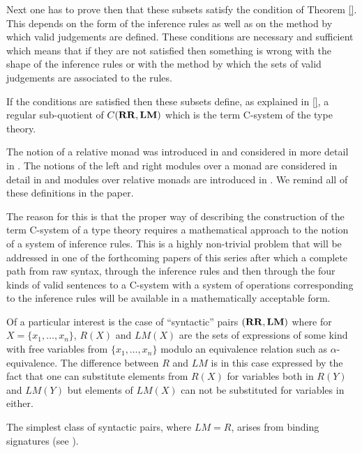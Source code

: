 \documentclass[11pt]{article}
\newcommand{\RR}{{\bf RR}}
\newcommand{\LM}{{\bf LM}}
\begin{document}
Next one has to prove then that these subsets satisfy the condition of Theorem \ref{}. This depends on the form of the inference rules as well as on the method by which valid judgements are defined. These conditions are necessary and sufficient which means that if they are not satisfied then something is wrong with the shape of the inference rules or with the method by which the sets of valid judgements are associated to the rules. 

If the conditions are satisfied then these subsets define, as explained in \ref{}, a regular sub-quotient of $C(\RR,\LM)$ which is the term C-system of the type theory. 
 




The notion of a relative monad was introduced in \cite[Def.1, p. 299]{ACU} and considered in more detail in \cite{ACU2}. The notions of the left and right modules over a monad are considered in detail in \cite{HM2007} and modules over relative monads are introduced in \cite{Ahrens}. We remind all of these definitions in the paper.  




 The reason for this is that the proper way of describing the construction of the term C-system of a type theory requires a mathematical approach to the notion of a system of inference rules. This is a highly non-trivial problem that will be addressed in one of the forthcoming papers of this series after which a complete path from raw syntax, through the inference rules and then through the four kinds of valid sentences to a C-system with a system of operations corresponding to the inference rules will be available in a mathematically acceptable form. 






Of a particular interest is the case of ``syntactic'' pairs $(\RR,\LM)$ where for $X=\{x_1,\dots,x_n\}$, $R(X)$ and $LM(X)$ are the sets of expressions of some kind with free variables from $\{x_1,\dots,x_n\}$ modulo an equivalence relation such as $\alpha$-equivalence. The difference between $R$ and $LM$ is in this case expressed by the fact that one can substitute elements from $R(X)$ for variables both in $R(Y)$ and $LM(Y)$ but elements of $LM(X)$ can not be substituted for variables in either. 

The simplest class of syntactic pairs, where $LM=R$, arises from binding signatures (see \cite[p.228]{HM2007}). 
\end{document}

